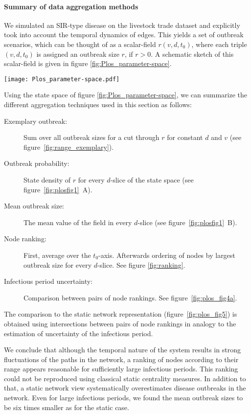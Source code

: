 \paragraph{Summary of data aggregation methods\color{Cayenne}{.}}
We simulated an SIR-type disease on the livestock trade dataset and explicitly took into account the temporal dynamics of edges.
This yields a set of outbreak scenarios, which can be thought of as a scalar-field $r(v,d,t_0)$, where each triple $(v,d,t_0)$ is assigned an outbreak size $r$, if $r>0$.
A schematic sketch of this scalar-field is given in figure \ref{fig:Plos_parameter-space}.
%
\begin{SCfigure}
\texttt{[image: Plos\_parameter-space.pdf]}
\caption{Scalar field representing the set of outbreak scenarios as defined in \eqref{eq:outbreak_set}.
Each combination of starting node $v$, starting time $t_0$ and infectious period $d$ yields an outbreak size $r(v,d,t_0)$.
The domain is bounded as defined in \eqref{eq:outbreak_set}.}
\label{fig:Plos_parameter-space}
\end{SCfigure}
%
Using the state space of figure \ref{fig:Plos_parameter-space}, we can summarize the different aggregation techniques used in this section as follows:
\begin{description}
\item [Exemplary outbreak:] Sum over all outbreak sizes for a cut through $r$ for constant $d$ and $v$ (see figure~\ref{fig:range_exemplary}).
\item [Outbreak probability:] State density of $r$ for every $d$-slice of the state space (see figure~\ref{fig:plosfig1}~A).
\item [Mean outbreak size:] The mean value of the field in every $d$-slice (see figure~\ref{fig:plosfig1}~B).
\item [Node ranking:] First, average over the $t_0$-axis. Afterwards ordering of nodes by largest outbreak size for every $d$-slice. See figure \ref{fig:ranking}.
\item [Infectious period uncertainty:] Comparison between pairs of node rankings. See figure~\ref{fig:plos_fig4a}.
\end{description}
%
The comparison to the static network representation (figure~\ref{fig:plos_fig5}) is obtained using intersections between pairs of node rankings in analogy to the estimation of uncertainty of the infectious period.

We conclude that although the temporal nature of the system results in strong fluctuations of the paths in the network, a ranking of nodes according to their range appears reasonable for sufficiently large infectious periods.
This ranking could not be reproduced using classical static centrality measures.
In addition to that, a static network view systematically overestimates disease outbreaks in the network.
Even for large infectious periods, we found the mean outbreak sizes to be six times smaller as for the static case.

